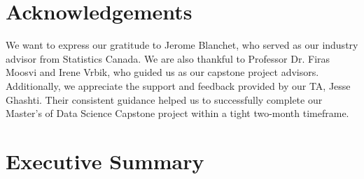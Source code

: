 \documentclass[11pt, a4paper]{article}
\begin{document}
\pagebreak



\thispagestyle{empty}
\setcounter{tocdepth}{2} %
{
  \hypersetup{linkcolor=black}
  \tableofcontents
}
\thispagestyle{empty}

\pagebreak
\thispagestyle{empty}
{
  \hypersetup{linkcolor=black}
  \small
  \listoffigures
}
\thispagestyle{empty}

\vspace{2pc}

\pagebreak
\thispagestyle{empty}
{
  \hypersetup{linkcolor=black}
  \listoftables
}
\pagebreak



\thispagestyle{empty}
\section*{Acknowledgements}

We want to express our gratitude to Jerome Blanchet, who served as our industry advisor from Statistics Canada. We are also thankful to Professor Dr. Firas Moosvi and Irene Vrbik, who guided us as our capstone project advisors. Additionally, we appreciate the support and feedback provided by our TA, Jesse Ghashti. Their consistent guidance helped us to successfully complete our Master's of Data Science Capstone project within a tight two-month timeframe.







\pagebreak
\section{Executive Summary}
\par

\fancyhf{}
\setcounter{page}{1}
\lhead{\thepage}
\end{document}
